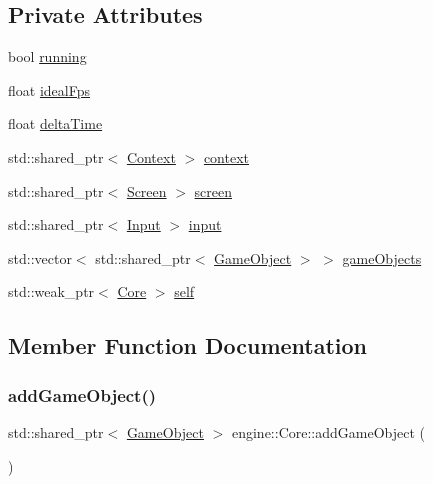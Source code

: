 \subsection*{Private Attributes}
\begin{DoxyCompactItemize}
\item 
bool \mbox{\hyperlink{classengine_1_1_core_a0e72beaea8705d13ae972dc1bf4cc300}{running}}
\item 
float \mbox{\hyperlink{classengine_1_1_core_ae32c8d8c1027c64e14868cf3f83badcf}{ideal\+Fps}}
\item 
float \mbox{\hyperlink{classengine_1_1_core_a1db4830be707d120511783ca9fb390c8}{delta\+Time}}
\item 
std\+::shared\+\_\+ptr$<$ \mbox{\hyperlink{classengine_1_1_context}{Context}} $>$ \mbox{\hyperlink{classengine_1_1_core_a279739fcb85a5af56dfa8cea70b905f8}{context}}
\item 
std\+::shared\+\_\+ptr$<$ \mbox{\hyperlink{classengine_1_1_screen}{Screen}} $>$ \mbox{\hyperlink{classengine_1_1_core_a34a2a57e4555db8ce7577f257f680e90}{screen}}
\item 
std\+::shared\+\_\+ptr$<$ \mbox{\hyperlink{classengine_1_1_input}{Input}} $>$ \mbox{\hyperlink{classengine_1_1_core_a2d52261488cd9cf11d08fe1506e70393}{input}}
\item 
std\+::vector$<$ std\+::shared\+\_\+ptr$<$ \mbox{\hyperlink{classengine_1_1_game_object}{Game\+Object}} $>$ $>$ \mbox{\hyperlink{classengine_1_1_core_ab491c7476cbc80ec113f8341a6ebceff}{game\+Objects}}
\item 
std\+::weak\+\_\+ptr$<$ \mbox{\hyperlink{classengine_1_1_core}{Core}} $>$ \mbox{\hyperlink{classengine_1_1_core_a89121092947e17412760fe93a5967d8f}{self}}
\end{DoxyCompactItemize}


\subsection{Member Function Documentation}
\mbox{\label{classengine_1_1_core_a1979ac12bd8a259218f42833fc230094}} 
\subsubsection{\texorpdfstring{add\+Game\+Object()}{addGameObject()}}
{\footnotesize\ttfamily std\+::shared\+\_\+ptr$<$ \mbox{\hyperlink{classengine_1_1_game_object}{Game\+Object}} $>$ engine\+::\+Core\+::add\+Game\+Object (\begin{DoxyParamCaption}{ }\end{DoxyParamCaption})}

